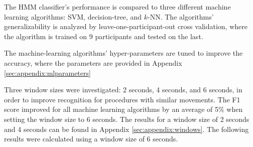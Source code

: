 \par The HMM classifier's performance is compared to three different machine learning algorithms: SVM, decision-tree, and $k$-NN. The algorithms' generalizability is analyzed by leave-one-participant-out cross validation, where the algorithm is trained on 9 participants and tested on the last.
\par The machine-learning algorithms' hyper-parameters are tuned to improve the accuracy, where the parameters are provided in Appendix \ref{sec:appendix:mlparameters}
\par Three window sizes were investigated: 2 seconds, 4 seconds, and 6 seconds, in order to improve recognition for procedures with similar movements. The F1 score improved for all machine learning algorithms by an average of 5\% when setting the window size to 6 seconds. The results for a window size of 2 seconds and 4 seconds can be found in Appendix \ref{sec:appendix:windows}. The following results were calculated using a window size of 6 seconds. 

